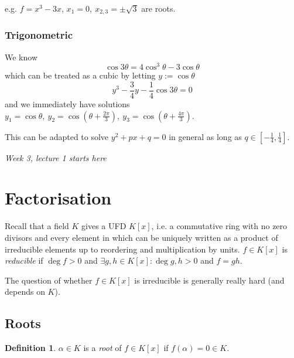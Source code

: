 \documentclass[a4paper]{article}
\theoremstyle{definition}
\newtheorem{defn}{Definition}[subsection]
\begin{document}
\begin{enumerate}
e.g. $f=x^3-3x$, $x_1=0,\ x_{2,3}=\pm \sqrt 3$ are roots.

\begin{center}
\end{center}
\end{enumerate}

\subsubsection{Trigonometric}
We know
\[
\cos 3\theta = 4\cos ^3\theta -3\cos \theta
\]
which can be treated as a cubic by letting $y:=\cos \theta$
\[
y^3-\frac34 y-\frac14 \cos 3\theta=0
\]
and we immediately have solutions $y_1=\cos \theta,\ y_2=\cos \left(\theta+\frac{2\pi}{3}\right),\ y_3=\cos \left(\theta+\frac{4\pi}{3}\right)$.

This can be adapted to solve $y^2+px+q=0$ in general as long as $q\in \left[-\frac14,\frac14\right]$.

\begin{flushright}
\textit{Week 3, lecture 1 starts here}
\end{flushright}

\section{Factorisation}
Recall that a field $K$ gives a UFD $K[x]$, i.e. a commutative ring with no zero divisors and every element in which can be uniquely written as a product of irreducible elements up to reordering and multiplication by units. $f\in K[x]$ is \textit{reducible} if $\deg f>0$ and $\exists g,h\in K[x]:\deg g,h>0$ and $f=gh$.

The question of whether $f\in K[x]$ is irreducible is generally really hard (and depends on $K$).
\subsection{Roots}
\begin{defn}
$\alpha\in K$ is a \textit{root} of $f\in K[x]$ if $f(\alpha)=0\in K$.
\end{defn}
\end{document}
